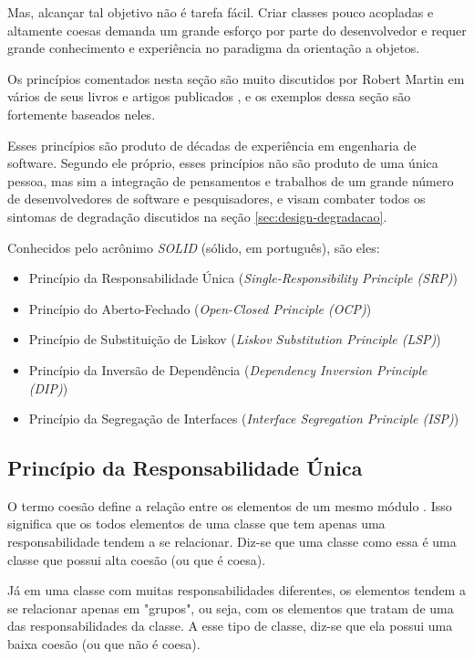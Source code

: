 Mas, alcançar tal objetivo não é tarefa fácil. Criar classes pouco acopladas e
altamente coesas demanda um grande esforço por parte do desenvolvedor e requer
grande conhecimento e experiência no paradigma da orientação a objetos.

Os princípios comentados nesta seção são muito discutidos por Robert Martin
em vários de seus livros e artigos publicados \cite{bob-martin}, e os exemplos
dessa seção são fortemente baseados neles. 

Esses princípios são produto de décadas de experiência em engenharia de
software. Segundo ele próprio, esses princípios não são produto de uma única 
pessoa, mas sim a integração de pensamentos e trabalhos de um grande número de 
desenvolvedores de software  e pesquisadores, e visam combater todos os sintomas
de degradação discutidos na seção \ref{sec:design-degradacao}.

Conhecidos pelo acrônimo \textit{SOLID} (sólido, em português), são eles:

\begin{itemize}
	\item Princípio da Responsabilidade Única (\textit{Single-Responsibility 
	Principle (SRP)})
	\item Princípio do Aberto-Fechado (\textit{Open-Closed Principle (OCP)})
	\item Princípio de Substituição de Liskov (\textit{Liskov Substitution 
	Principle (LSP)})
	\item Princípio da Inversão de Dependência (\textit{Dependency Inversion
	Principle (DIP)})
	\item Princípio da Segregação de Interfaces (\textit{Interface Segregation 
	Principle (ISP)})
\end{itemize}

\subsection{Princípio da Responsabilidade Única}
\label{subsec:principio-srp}

O termo coesão define a relação entre os elementos de um mesmo módulo
\cite{demarco} \cite{pagejones}. Isso significa que os todos elementos de uma 
classe que tem apenas uma responsabilidade tendem a se relacionar. Diz-se que
uma classe como essa é uma classe que possui alta coesão (ou que é coesa). 

Já em uma classe com muitas responsabilidades diferentes, os elementos tendem  a
se relacionar apenas em "grupos", ou seja, com os elementos que tratam de uma 
das responsabilidades da classe. A esse tipo de classe, diz-se que ela possui 
uma baixa coesão (ou que não é coesa).

